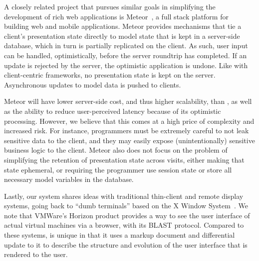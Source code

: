 


A closely related project that pursues similar goals in simplifying the development
of rich web applications is Meteor~\cite{meteor}, a full stack platform for building 
web and mobile applications.  Meteor provides mechanisms that tie a client's presentation
state directly to model state that is kept in a server-side database, which in turn is 
partially replicated on the client.  As such, user input can be handled, optimistically, before 
the server roundtrip has completed. If an update is rejected by the server, the optimistic 
application is undone. Like with client-centric frameworks, no presentation state is kept on
the server. Asynchronous updates to model data is pushed to clients.

Meteor will have lower server-side cost, and thus higher scalability, than \cb, as well
as the ability to reduce user-perceived latency because of its optimistic processing.
However, we believe that this comes at a high price of complexity and increased risk.
For instance, programmers must be extremely careful to not leak sensitive data to the 
client, and they may easily expose (unintentionally) sensitive business logic to the client.  
Meteor also does not focus on the problem of simplifying the retention of presentation
state across visits, either making that state ephemeral, or requiring the programmer
use session state or store all necessary model variables in the database.

Lastly, our system shares ideas with traditional thin-client and remote display 
systems, going back to ``dumb terminals'' based on the X Window 
System~\cite{ScheiflerGettys:acmtg1986}.  We note that VMWare's Horizon product provides
a way to see the user interface of actual virtual machines via a browser, with its
BLAST protocol.  Compared to these systems, \cb{} is 
unique in that it uses a markup document and differential update to it to 
describe the structure and evolution of the user interface that is rendered 
to the user.  

